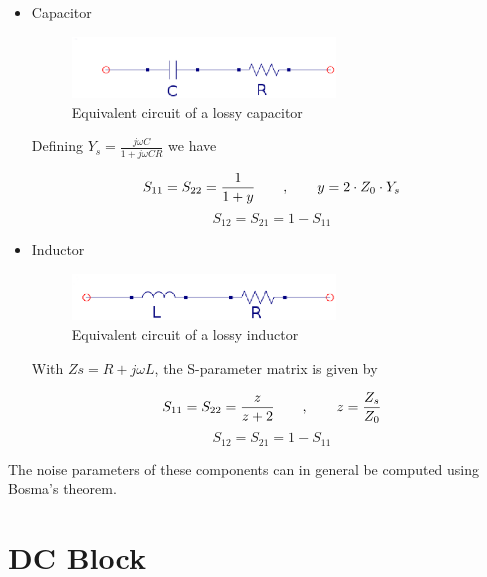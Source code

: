 \begin{itemize}

\item Capacitor
\begin{figure}[ht]
\begin{center}
\includegraphics[width=7cm]{capq}
\end{center}
\caption{Equivalent circuit of a lossy capacitor}
\label{fig:capq_ec}
\end{figure}

Defining $Y_s = \frac{j \omega C}{1+j \omega C R}$ we have

\begin{equation}
S_{11} = S_{22} = \frac{1}{1 + y} \qquad , \qquad y = 2 \cdot Z_0 \cdot Y_s\\
\end{equation}
\begin{equation}
S_{12} = S_{21} = 1-S_{11}
\end{equation}

\item Inductor
\begin{figure}[ht]
\begin{center}
\includegraphics[width=7cm]{indq}
\end{center}
\caption{Equivalent circuit of a lossy inductor}
\label{fig:indq_ec}
\end{figure}

With $Zs = R + j \omega L$, the S-parameter matrix is given by

\begin{equation}
S_{11} = S_{22} = \frac{z}{z + 2} \qquad , \qquad z = \frac{Z_s}{Z_0}\\
\end{equation}
\begin{equation}
S_{12} = S_{21} = 1-S_{11}
\end{equation}

\end{itemize}

The noise parameters of these components can in general be computed using Bosma's theorem.


\section{DC Block}

